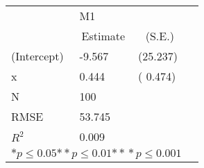 \begin{tabular}{@{}l*{3}{l}@{}}
\hline
  &\multicolumn{2}{l}{M1  }\tabularnewline
 &\multicolumn{1}{c}{Estimate}&\multicolumn{1}{c}{(S.E.)}\tabularnewline
 \hline
 \hline
  (Intercept) & -9.567 & (25.237) \tabularnewline
  x & 0.444 & ( 0.474) \tabularnewline
 \hline
 N&\multicolumn{1}{l}{100}  & \tabularnewline
 RMSE&53.745\tabularnewline
 $R^2$&0.009\tabularnewline
 \hline
\hline
 
 \multicolumn{3}{l}{  ${*  p}\le 0.05$${*\!\!*  p}\le 0.01$${*\!\!*\!\!*  p}\le 0.001$}\tabularnewline
 \end{tabular}